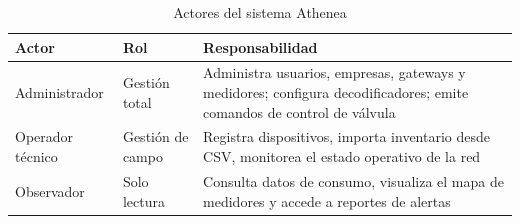 \documentclass[12pt,a4paper,oneside]{report}
\begin{document}
\begin{table}[H]
\caption{Actores del sistema Athenea}\label{tab:actores}
\centering
\begin{tabularx}{\textwidth}{llX}
\toprule
\textbf{Actor} & \textbf{Rol} & \textbf{Responsabilidad} \\
\midrule
Administrador & Gestión total & Administra usuarios, empresas, gateways y medidores; configura decodificadores; emite comandos de control de válvula \\
Operador técnico & Gestión de campo & Registra dispositivos, importa inventario desde CSV, monitorea el estado operativo de la red \\
Observador & Solo lectura & Consulta datos de consumo, visualiza el mapa de medidores y accede a reportes de alertas \\
\bottomrule
\end{tabularx}
\end{table}
\end{document}
